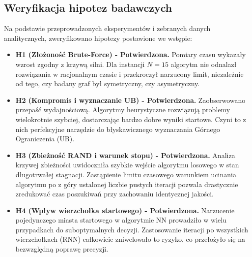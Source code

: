 \documentclass[conference]{IEEEtran}
\begin{document}
        \subsection{Weryfikacja hipotez badawczych}
            Na podstawie przeprowadzonych eksperymentów i zebranych danych analitycznych, zweryfikowano hipotezy postawione we wstępie:
            \begin{itemize}
                \item \textbf{H1 (Złożoność Brute-Force) - Potwierdzona.} Pomiary czasu wykazały wzrost zgodny z krzywą silni. Dla instancji $N=15$ algorytm nie odnalazł rozwiązania w racjonalnym czasie i przekroczył narzucony limit, niezależnie od tego, czy badany graf był symetryczny, czy asymetryczny.
                \item \textbf{H2 (Kompromis i wyznaczanie UB) - Potwierdzona.} Zaobserwowano przepaść wydajnościową. Algorytmy heurystyczne rozwiązują problemy wielokrotnie szybciej, dostarczając bardzo dobre wyniki startowe. Czyni to z nich perfekcyjne narzędzie do błyskawicznego wyznaczania Górnego Ograniczenia (UB).
                \item \textbf{H3 (Zbieżność RAND i warunek stopu) - Potwierdzona.} Analiza krzywej zbieżności uwidoczniła szybkie wejście algorytmu losowego w stan długotrwałej stagnacji. Zastąpienie limitu czasowego warunkiem ucinania algorytmu po z góry ustalonej liczbie pustych iteracji pozwala drastycznie zredukować czas poszukiwań przy zachowaniu identycznej jakości.                
                \item \textbf{H4 (Wpływ wierzchołka startowego) - Potwierdzona.} Narzucenie pojedynczego miasta startowego w algorytmie NN prowadziło w wielu przypadkach do suboptymalnych decyzji. Zastosowanie iteracji po wszystkich wierzchołkach (RNN) całkowicie zniwelowało to ryzyko, co przełożyło się na bezwzględną poprawę precyzji.
            \end{itemize}
\end{document}
